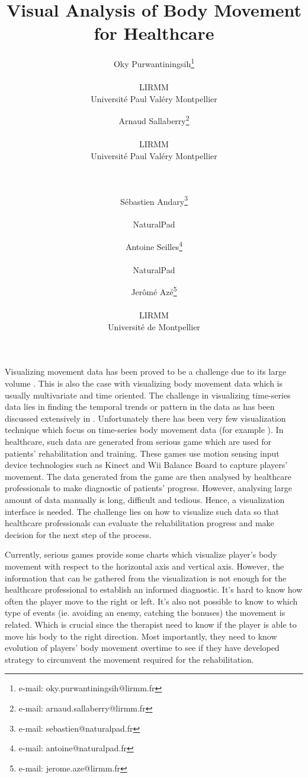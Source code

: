 \documentclass{vgtc}                          %
\title{Visual Analysis of Body Movement for Healthcare}
\author{Oky Purwantiningsih\thanks{e-mail: oky.purwantiningsih@lirmm.fr}\\ %
        \parbox{2in}{\scriptsize \centering LIRMM \\ Universit\'{e} Paul Val\'{e}ry Montpellier} %
\and Arnaud Sallaberry\thanks{e-mail: arnaud.sallaberry@lirmm.fr}\\ %
     \parbox{2in}{\scriptsize \centering LIRMM \\ Universit\'{e} Paul Val\'{e}ry Montpellier} \\  \\ %
\and S\'{e}bastien Andary\thanks{e-mail: sebastien@naturalpad.fr}\\ %
\parbox{2in}{\scriptsize \centering NaturalPad}%
\and Antoine Seilles\thanks{e-mail: antoine@naturalpad.fr}\\ %
\parbox{2in}{\scriptsize \centering NaturalPad}%
\and Jer\^{o}m\'{e} Az\'{e}\thanks{e-mail: jerome.aze@lirmm.fr}\\ %
\parbox{2in}{\scriptsize \centering LIRMM \\ Universit\'{e} de Montpellier} %
	} %
\begin{document}


\maketitle


Visualizing movement data has been proved to be a challenge due to its large volume \cite{adrienko_book}. This is also the case with visualizing body movement data which is usually multivariate and time oriented. The challenge in visualizing time-series data lies in finding the temporal trends or pattern in the data as has been discussed extensively in \cite{aigner}. Unfortunately there has been very few visualization technique which focus on time-series body movement data (for example \cite{bernard2013}). In healthcare, such data are generated from serious game which are used for patients' rehabilitation and training. These games use motion sensing input device technologies such as Kinect and Wii Balance Board to capture players' movement. The data generated from the game are then analysed by healthcare professionals to make diagnostic of patients' progress. However, analysing large amount of data manually is long, difficult and tedious. Hence, a visualization interface is needed. The challenge lies on how to visualize such data so that healthcare professionals can evaluate the rehabilitation progress and make decision for the next step of the process.

Currently, serious games provide some charts which visualize player's body movement with respect to the horizontal axis and vertical axis. However, the information that can be gathered from the visualization is not enough for the healthcare professional to establish an informed diagnostic. It's hard to know how often the player move to the right or left. It's also not possible to know to which type of events (ie. avoiding an enemy, catching the bonuses) the movement is related. Which is crucial since the therapist need to know if the player is able to move his body to the right direction. Most importantly, they need to know evolution of players' body movement overtime to see if they have developed strategy to circumvent the movement required for the rehabilitation.
\end{document}
